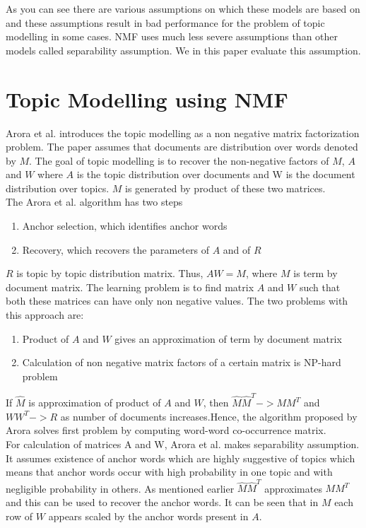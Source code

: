 \documentclass[a4paper,11pt]{article}
\begin{document}
As you can see there are various assumptions on which these models are based on and these assumptions result in bad performance for the problem of topic modelling in some cases. NMF uses much less severe assumptions than other models called separability assumption. We in this paper evaluate this assumption.


\section{Topic Modelling using NMF}
Arora et al. \cite{tm} introduces the topic modelling as a non negative matrix factorization problem. The paper assumes that documents are distribution over words denoted by $M$. The goal of topic modelling is to recover the non-negative factors of $M$, $A$ and $W$ where $A$ is the topic distribution over documents and W is the document distribution over topics. $M$ is generated by product of these two matrices.\\

The Arora et al. \cite{tm} algorithm has two steps

\begin{enumerate}
\item Anchor selection, which identifies anchor words
\item Recovery, which recovers the parameters of $A$ and of $R$
\end{enumerate}  

$R$ is topic by topic distribution matrix. Thus, $AW = M$, where $M$ is term by document matrix. The learning problem is to find matrix $A$ and $W$ such that both these matrices can have only non negative values. The two problems with this approach are: \\

\begin{enumerate}
\item Product of $A$ and $W$ gives an approximation of term by document matrix  
\item Calculation of non negative matrix factors of a certain matrix is NP-hard problem
\end{enumerate}

If $\hat{M}$  is approximation of product of $A$ and $W$, then $\hat{M} \hat{M}^T -> M M^T $ and $W W^T -> R$ as number of documents increases.Hence, the algorithm proposed by Arora solves first problem by computing word-word co-occurrence matrix. \\

For calculation of matrices A and W, Arora et al. \cite{tm} makes separability assumption. It assumes existence of anchor words which are highly suggestive of topics which means that anchor words occur with high probability in one topic and with negligible probability in others. As mentioned earlier $\hat{M} \hat{M}^T$ approximates $M M^T $ and this can be used to recover the anchor words. It can be seen that in $M$ each row of $W$ appears scaled by the anchor words present in $A$. \\
\end{document}
